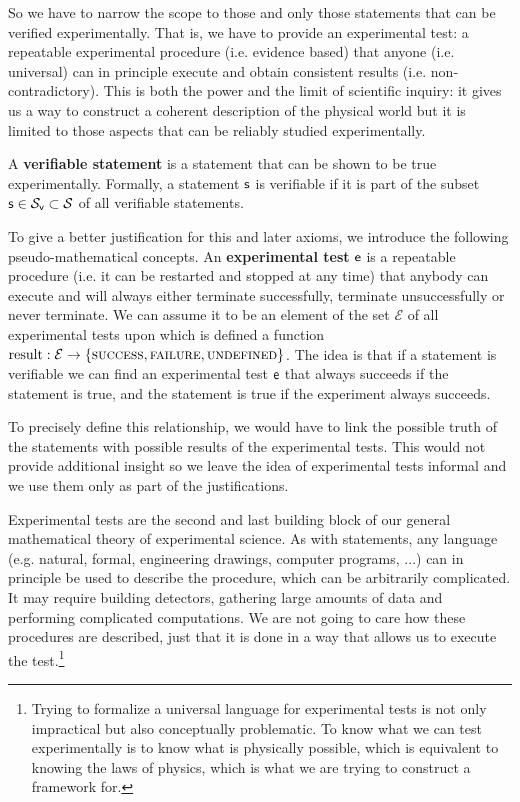 \documentclass[11pt,letterpaper,fleqn]{memoir} %
\begin{document}
So we have to narrow the scope to those and only those statements that can be verified experimentally. That is, we have to provide an experimental test: a repeatable experimental procedure (i.e. evidence based) that anyone (i.e. universal) can in principle execute and obtain consistent results (i.e. non-contradictory). This is both the power and the limit of scientific inquiry: it gives us a way to construct a coherent description of the physical world but it is limited to those aspects that can be reliably studied experimentally.

\begin{mathSection}
\begin{axiom}\label{ax_verifiable_statements}
	A \textbf{verifiable statement} is a statement that can be shown to be true experimentally. Formally, a statement $\mathsf{s}$ is verifiable if it is part of the subset $\mathsf{s} \in \mathcal{S}_\textsf{v} \subset \mathcal{S}$ of all verifiable statements.
\end{axiom}
\begin{justification}
	To give a better justification for this and later axioms, we introduce the following pseudo-mathematical concepts. An \textbf{experimental test} $\mathsf{e}$ is a repeatable procedure (i.e. it can be restarted and stopped at any time) that anybody can execute and will always either terminate successfully, terminate unsuccessfully or never terminate. We can assume it to be an element of the set $\mathcal{E}$ of all experimental tests upon which is defined a function $\operatorname{result}: \mathcal{E} \to \{\textsc{success}, \textsc{failure}, \textsc{undefined}\}$. The idea is that if a statement is verifiable we can find an experimental test $\mathsf{e}$ that always succeeds if the statement is true, and the statement is true if the experiment always succeeds.
	
	To precisely define this relationship, we would have to link the possible truth of the statements with possible results of the experimental tests. This would not provide additional insight so we leave the idea of experimental tests informal and we use them only as part of the justifications.
\end{justification}
\end{mathSection}

Experimental tests are the second and last building block of our general mathematical theory of experimental science. As with statements, any language (e.g. natural, formal, engineering drawings, computer programs, ...) can in principle be used to describe the procedure, which can be arbitrarily complicated. It may require building detectors, gathering large amounts of data and performing complicated computations. We are not going to care how these procedures are described, just that it is done in a way that allows us to execute the test.\footnote{Trying to formalize a universal language for experimental tests is not only impractical but also conceptually problematic. To know what we can test experimentally is to know what is physically possible, which is equivalent to knowing the laws of physics, which is what we are trying to construct a framework for.}
\end{document}
